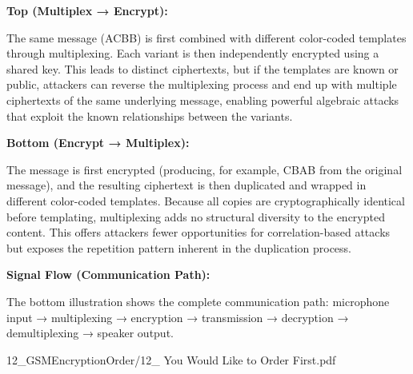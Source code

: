 \begin{SideNotePage}{
  \textbf{Top (Multiplex → Encrypt):} \par The same message (ACBB) is first combined with different color-coded templates through multiplexing. Each variant is then independently encrypted using a shared key. This leads to distinct ciphertexts, but if the templates are known or public, attackers can reverse the multiplexing process and end up with multiple ciphertexts of the same underlying message, enabling powerful algebraic attacks that exploit the known relationships between the variants.

  \textbf{Bottom (Encrypt → Multiplex):} \par The message is first encrypted (producing, for example, CBAB from the original message), and the resulting ciphertext is then duplicated and wrapped in different color-coded templates. Because all copies are cryptographically identical before templating, multiplexing adds no structural diversity to the encrypted content. This offers attackers fewer opportunities for correlation-based attacks but exposes the repetition pattern inherent in the duplication process. \par
  \textbf{Signal Flow (Communication Path):} \par The bottom illustration shows the complete communication path: microphone input → multiplexing → encryption → transmission → decryption → demultiplexing → speaker output.

}{12_GSMEncryptionOrder/12_ You Would Like to Order First.pdf}
\end{SideNotePage}